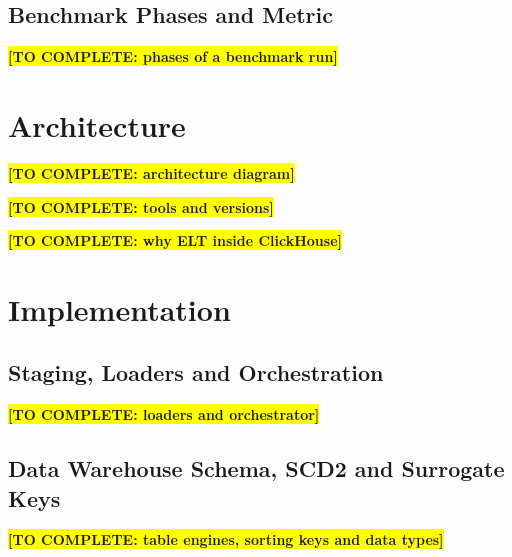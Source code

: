 \documentclass[11pt,a4paper]{article}
\newcommand{\todo}[1]{\colorbox{yellow}{\textbf{[TO COMPLETE: #1]}}}
\begin{document}
\subsection{Benchmark Phases and Metric}
\todo{phases of a benchmark run}

\section{Architecture}
\label{sec:architecture}

\todo{architecture diagram}

\todo{tools and versions}

\todo{why ELT inside ClickHouse}

\section{Implementation}
\label{sec:implementation}

\subsection{Staging, Loaders and Orchestration}
\label{sec:staging}
\todo{loaders and orchestrator}

\subsection{Data Warehouse Schema, SCD2 and Surrogate Keys}
\label{sec:schema}
\todo{table engines, sorting keys and data types}
\end{document}
